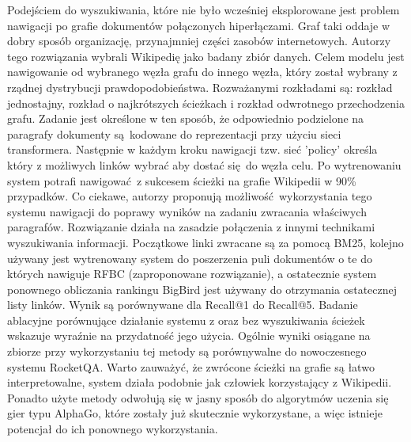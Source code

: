 Podejściem do wyszukiwania, które nie było wcześniej eksplorowane jest problem nawigacji po grafie dokumentów połączonych hiperłączami. Graf taki oddaje w dobry sposób organizację, przynajmniej części zasobów internetowych. Autorzy tego rozwiązania wybrali Wikipedię jako badany zbiór danych. Celem modelu jest nawigowanie od wybranego węzła grafu do innego węzła, który został wybrany z rządnej dystrybucji prawdopodobieństwa. Rozważanymi rozkładami są: rozkład jednostajny, rozkład o najkrótszych ścieżkach i rozkład odwrotnego przechodzenia grafu. Zadanie jest określone w ten sposób, że odpowiednio podzielone na paragrafy dokumenty są kodowane do reprezentacji przy użyciu sieci transformera. Następnie w każdym kroku nawigacji tzw. sieć 'policy' określa który z możliwych linków wybrać aby dostać się do węzła celu. 
Po wytrenowaniu system potrafi nawigować z sukcesem ścieżki na grafie Wikipedii w 90\% przypadków. Co ciekawe, autorzy proponują możliwość wykorzystania tego systemu nawigacji do poprawy wyników na zadaniu zwracania właściwych paragrafów. Rozwiązanie działa na zasadzie połączenia z innymi technikami wyszukiwania informacji. Początkowe linki zwracane są za pomocą BM25, kolejno używany jest wytrenowany system do poszerzenia puli dokumentów o te do których nawiguje RFBC (zaproponowane rozwiązanie), a ostatecznie system ponownego obliczania rankingu BigBird jest używany do otrzymania ostatecznej listy linków. Wynik są porównywane dla Recall@1 do Recall@5. Badanie ablacyjne porównujące działanie systemu z oraz bez wyszukiwania ścieżek wskazuje wyraźnie na przydatność jego użycia. Ogólnie wyniki osiągane na zbiorze przy wykorzystaniu tej metody są porównywalne do nowoczesnego systemu RocketQA. \autocite{zaheer2022learning} Warto zauważyć, że zwrócone ścieżki na grafie są łatwo interpretowalne, system działa podobnie jak człowiek korzystający z Wikipedii. Ponadto użyte metody odwołują się w jasny sposób do algorytmów uczenia się gier typu AlphaGo, które zostały już skutecznie wykorzystane, a więc istnieje potencjał do ich ponownego wykorzystania.